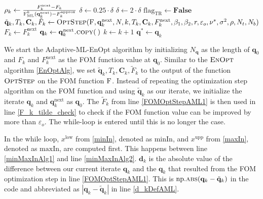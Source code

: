 \begin{algorithm}[H]
\begin{algorithmic}[1]
\State\label{rhoKDef} $\rho_k\gets \frac{F^\mathrm{next}_k-F_k}{\Call{F$_\mathrm{ML}^k$}{\mathbf{q}^\mathrm{next}_k}-F^\mathrm{approx}_k}$
\State $\delta\gets0.25\cdot\delta$
\Else
{}
\State $\delta\gets2\cdot\delta$
\EndIf
\EndIf
{}
\State $\mathrm{flag}_\mathrm{TR}\gets\mathbf{False}$
\EndIf
\EndWhile
\EndWhile
\State\label{FOMOptStepAML2} $\tilde{\mathbf{q}}_k,T_k,\mathbf{C}_k,\tilde{F}_k\gets\Call{OptStep}{\textproc{F},\mathbf{q}^\mathrm{next}_k,N,k,T_k,\mathbf{C}_k, F^\mathrm{next}_k, \beta_1, \beta_2, r, \varepsilon_o ,\nu^*, \sigma^2, \rho, N_t, N_b}$
\State $F_k \gets F^\mathrm{next}_k$
\State $\mathbf{q}_k \gets \mathbf{q}^\mathrm{next}_k\Call{.copy}{\:}$
\State $k\gets k+1$
\EndWhile
\State \Return $\mathbf{q}^*\gets\mathbf{q}_k$
\EndFunction
\end{algorithmic}
\end{algorithm}

We start the Adaptive-ML-EnOpt algorithm by initializing $N_\mathbf{q}$ as the length of ${\mathbf{q}_0}$ and $F_k$ and $F^\mathrm{next}_k$ as the FOM function value at $\mathbf{q}_0$. Similar to the $\textproc{EnOpt}$ algorithm \ref{EnOptAlg}, we set $\tilde{\mathbf{q}}_k,T_k,\mathbf{C}_k,\tilde{F}_k$ to the output of the function $\textproc{OptStep}$ on the FOM function $\textproc{F}$. Instead of repeating the optimization step algorithm on the FOM function and using $\tilde{\mathbf{q}}_k$ as our iterate, we initialize the iterate $\mathbf{q}_k$ and $\mathbf{q}^\mathrm{next}_k$ as $\mathbf{q}_0$. The $\tilde{F}_k$ from line \ref{FOMOptStepAML1} is then used in line \ref{F_k_tilde_check} to check if the FOM function value can be improved by more than $\varepsilon_o$. The while-loop is entered until this is no longer the case.

In the while loop, $x^\mathrm{low}$ from \eqref{minIn}, denoted as $\mathrm{minIn}$, and $x^\mathrm{upp}$ from \eqref{maxIn}, denoted as $\mathrm{maxIn}$, are computed first. This happens between line \ref{minMaxInAlg1} and line \ref{minMaxInAlg2}. $\mathbf{d}_k$ is the absolute value of the difference between our current iterate $\mathbf{q}_k$ and the $\mathbf{q}_k$ that resulted from the FOM optimization step in line \ref{FOMOptStepAML1}. This is $\mathrm{np.}\Call{abs}{\mathbf{q}_k-\tilde{\mathbf{q}}_k}$ in the code and abbreviated as $|\mathbf{q}_k-\tilde{\mathbf{q}}_k|$ in line \ref{d_kDefAML}.

